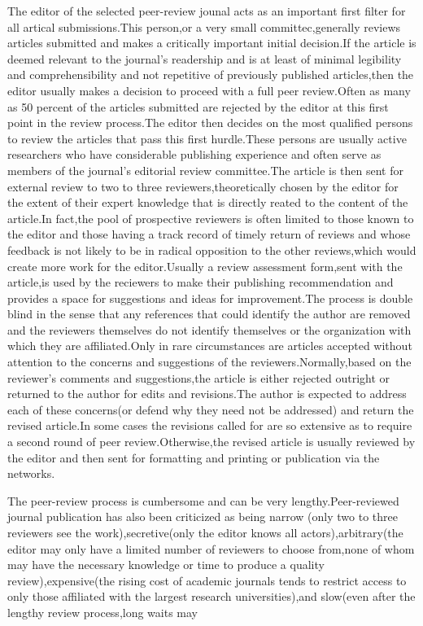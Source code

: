 \documentclass[10pt,a4paper]{article}
\begin{document}
The editor of the selected peer-review jounal acts as an important first filter for all artical submissions.This person,or a very small committec,generally reviews articles submitted and makes a critically important initial decision.If the article is deemed relevant to the journal's readership and is at least of minimal legibility and comprehensibility and not repetitive of previously published articles,then the editor usually makes a decision to proceed with a full peer review.Often as many as 50 percent of the articles submitted are rejected by the editor at this first point in the review process.The editor then decides on the most qualified persons to review the articles that pass this first hurdle.These persons are usually active researchers who have considerable publishing experience and often serve as members of the journal's editorial review committee.The article is then sent for external review to two to three reviewers,theoretically chosen by the editor for the extent of their expert knowledge that is directly reated to the content of the article.In fact,the pool of prospective reviewers is often limited to those known to the editor and those having a track record of timely return of reviews and whose feedback is not likely to be in radical opposition to the other reviews,which would create more work for the editor.Usually a review assessment form,sent with the article,is used by the reciewers to make their publishing recommendation and provides a space for suggestions and ideas for improvement.The process is double blind in the sense that any references that could identify the author are removed and the reviewers themselves do not identify themselves or the organization with which they are affiliated.Only in rare circumstances are articles accepted without attention to the concerns and suggestions of the reviewers.Normally,based on the reviewer's comments and suggestions,the article is either rejected outright or returned to the author for edits and revisions.The author is expected to address each of these concerns(or defend why they need not be addressed) and return the revised article.In some cases the revisions called for are so extensive as to require a second round of peer review.Otherwise,the revised article is usually reviewed by the editor and then sent for formatting and printing or publication via the networks.

The peer-review process is cumbersome and can be very lengthy.Peer-reviewed journal publication has also been criticized as being narrow (only two to three reviewers see the work),secretive(only the editor knows all actors),arbitrary(the editor may only have a limited number of reviewers to choose from,none of whom may have the necessary knowledge or time to produce a quality review),expensive(the rising cost of academic journals tends to restrict access to only those affiliated with the largest research universities),and slow(even after the lengthy review process,long waits may
\end{document}
